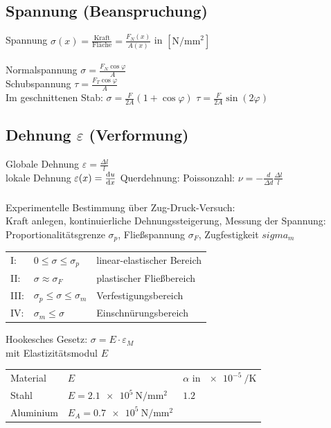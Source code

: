 \documentclass[fs, footer]{latex4ei}
\begin{document}
\begin{multicols}{4}
	\subsection{Spannung (Beanspruchung)}
	Spannung $\sigma(x) = \frac{\text{Kraft}}{\text{Fläche}} = \frac{F_N(x)}{A(x)}$ in $[\si{\newton \per \milli \meter^2}]$\\
	\\
	Normalspannung $\sigma = \frac{F_N \cos{\varphi}}{A}$\\
	Schubspannung $\tau = \frac{F_T \cos{\varphi}}{A}$\\

	Im geschnittenen Stab: $\sigma = \frac{F}{2A} (1 + \cos \varphi)$ \qquad $\tau = \frac{F}{2A} \sin (2 \varphi)$\\
	
	\subsection{Dehnung $\varepsilon$ (Verformung)}
	 
	Globale Dehnung $\varepsilon = \frac{\Delta l}{l}$ \\
	lokale Dehnung $\varepsilon(x) = \frac{\diff u}{\diff x}$
	Querdehnung: Poissonzahl: $\nu = - \frac{d}{\Delta d} \frac{\Delta l}{l}$\\
	\\
	Experimentelle Bestimmung über Zug-Druck-Versuch:\\
	Kraft anlegen, kontinuierliche Dehnungssteigerung, Messung der Spannung:\\
	Proportionalitätsgrenze $\sigma_p$, Fließspannung $\sigma_F$, Zugfestigkeit $sigma_m$\\
	\begin{tabular}{lll}
	I: & $0 \le \sigma \le \sigma_p$ & linear-elastischer Bereich\\
	II: & $\sigma \approx \sigma_F$ & plastischer Fließbereich\\
	III: & $\sigma_p \le \sigma \le \sigma_m$ & Verfestigungsbereich\\
	IV: & $\sigma_m \le \sigma$ & Einschnürungsbereich\\
	\end{tabular}
	
	Hookesches Gesetz: $\sigma = E \cdot \varepsilon_M$\\
	mit Elastizitätsmodul $E$
	
	\begin{tabular}{lll}
		Material & $E$ & $\alpha$ in $\SI{e-5}{\per \kelvin}$\\ 
		Stahl & $E = \SI{2.1e5}{\newton \per \milli \meter^2}$ & $1.2$\\
		Aluminium & $E_A = \SI{0.7e5}{\newton \per \milli \meter^2}$\\	
	\end{tabular}


\end{multicols}
\end{document}
